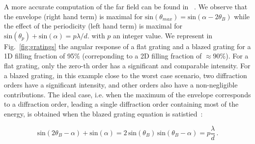 \documentclass[12pt]{iopart}
\begin{document}
A more accurate computation of the far field can be found  in ~\cite{Wang2023diffraction}.
We observe that the envelope (right hand term) is maximal for $\text{sin}(\theta_{max}) = \text{sin}(\alpha-2\theta_B)$ 
while the effect of the periodicity (left hand term) is maximal for $\text{sin}(\theta_p)+ \text{sin}(\alpha) = p \lambda/d$. 
with $p$ an integer value.
We represent in Fig.~\ref{fig:gratings} the angular response of a flat grating and a blazed grating 
for a 1D filling fraction of 95\% (correponding to a 2D filling fraction of $\approx 90$\%).
For a flat grating, only the zero-th order has a significant and comparable intensity. 
For a blazed grating, in this example close to the worst case scenario, 
two diffraction orders have a significant intensity, 
and other orders also have a non-negligible contributions. 
The ideal case, i.e. when the maximum of the envelope corresponds to a diffraction order,
leading a single diffraction order containing most of the energy,
is obtained when the blazed grating equation is satistied~\cite{Casini2014on}:

\begin{equation}
  \text{sin}(2\theta_B-\alpha) + \text{sin}(\alpha) 
    = 2 \,\text{sin}(\theta_B)  \,\text{sin}(\theta_B-\alpha) 
    = p\frac{\lambda}{d} \, .
  \label{eq:blazed_eq}
\end{equation}

\end{document}
